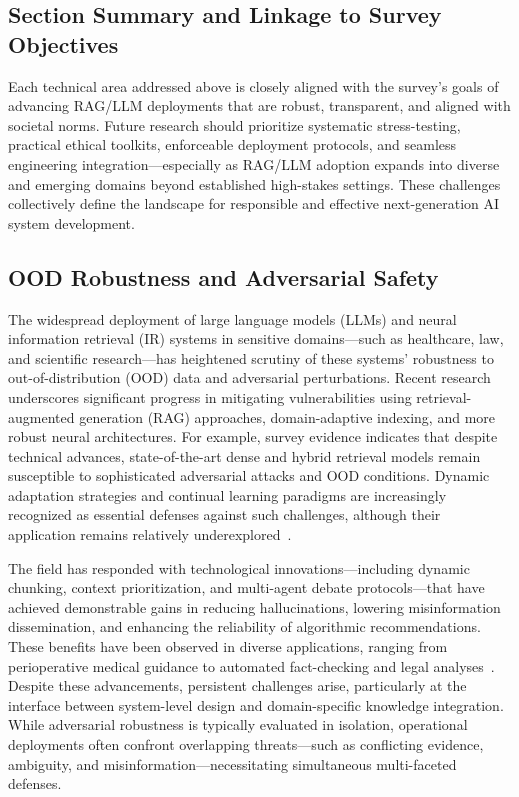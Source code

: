 \documentclass[sigconf]{acmart}
\begin{document}
\subsection*{Section Summary and Linkage to Survey Objectives}
Each technical area addressed above is closely aligned with the survey's goals of advancing RAG/LLM deployments that are robust, transparent, and aligned with societal norms. Future research should prioritize systematic stress-testing, practical ethical toolkits, enforceable deployment protocols, and seamless engineering integration—especially as RAG/LLM adoption expands into diverse and emerging domains beyond established high-stakes settings. These challenges collectively define the landscape for responsible and effective next-generation AI system development.

\subsection{OOD Robustness and Adversarial Safety}

The widespread deployment of large language models (LLMs) and neural information retrieval (IR) systems in sensitive domains—such as healthcare, law, and scientific research—has heightened scrutiny of these systems’ robustness to out-of-distribution (OOD) data and adversarial perturbations. Recent research underscores significant progress in mitigating vulnerabilities using retrieval-augmented generation (RAG) approaches, domain-adaptive indexing, and more robust neural architectures. For example, survey evidence indicates that despite technical advances, state-of-the-art dense and hybrid retrieval models remain susceptible to sophisticated adversarial attacks and OOD conditions. Dynamic adaptation strategies and continual learning paradigms are increasingly recognized as essential defenses against such challenges, although their application remains relatively underexplored~\cite{ref7}.

The field has responded with technological innovations—including dynamic chunking, context prioritization, and multi-agent debate protocols—that have achieved demonstrable gains in reducing hallucinations, lowering misinformation dissemination, and enhancing the reliability of algorithmic recommendations. These benefits have been observed in diverse applications, ranging from perioperative medical guidance to automated fact-checking and legal analyses~\cite{ref9,ref10,ref20,ref25,ref26,ref36,ref37,ref49,ref52,ref53,ref54,ref61,ref62,ref63,ref64}. Despite these advancements, persistent challenges arise, particularly at the interface between system-level design and domain-specific knowledge integration. While adversarial robustness is typically evaluated in isolation, operational deployments often confront overlapping threats—such as conflicting evidence, ambiguity, and misinformation—necessitating simultaneous multi-faceted defenses.
\end{document}
